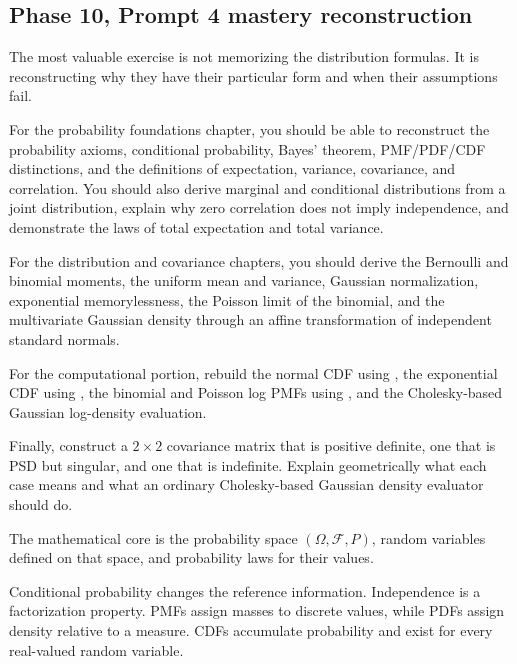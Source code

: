 \subsection{Phase 10, Prompt 4 mastery reconstruction}\label{02-foundations-ii-ch031-phase-10-prompt-4-mastery-reconstruction}

\hypertarget{02-foundations-ii-ch031-phase-10-prompt-4-mastery-reconstruction}{}

The most valuable exercise is not memorizing the distribution formulas. It is reconstructing why they have their particular form and when their assumptions fail.

For the probability foundations chapter, you should be able to reconstruct the probability axioms, conditional probability, Bayes' theorem, PMF/PDF/CDF distinctions, and the definitions of expectation, variance, covariance, and correlation. You should also derive marginal and conditional distributions from a joint distribution, explain why zero correlation does not imply independence, and demonstrate the laws of total expectation and total variance.

For the distribution and covariance chapters, you should derive the Bernoulli and binomial moments, the uniform mean and variance, Gaussian normalization, exponential memorylessness, the Poisson limit of the binomial, and the multivariate Gaussian density through an affine transformation of independent standard normals.

For the computational portion, rebuild the normal CDF using , the exponential CDF using , the binomial and Poisson log PMFs using , and the Cholesky-based Gaussian log-density evaluation.

Finally, construct a \(2\times2\) covariance matrix that is positive definite, one that is PSD but singular, and one that is indefinite. Explain geometrically what each case means and what an ordinary Cholesky-based Gaussian density evaluator should do.

The mathematical core is the probability space \((\Omega,\mathcal F,P)\), random variables defined on that space, and probability laws for their values.

Conditional probability changes the reference information. Independence is a factorization property. PMFs assign masses to discrete values, while PDFs assign density relative to a measure. CDFs accumulate probability and exist for every real-valued random variable.

